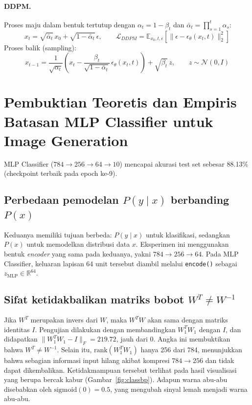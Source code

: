 \documentclass{article}
\begin{document}
\paragraph{DDPM.} Proses maju dalam bentuk tertutup dengan $\alpha_t = 1 - \beta_t$ dan $\bar{\alpha}_t = \prod_{s=1}^{t}\alpha_s$:
\begin{equation}
    x_t = \sqrt{\bar{\alpha}_t}\, x_0 + \sqrt{1 - \bar{\alpha}_t}\, \epsilon, \qquad
    \mathcal{L}_{DDPM} = \mathbb{E}_{x_0, t, \epsilon}\left[\lVert \epsilon - \epsilon_\theta(x_t, t) \rVert_2^2\right]
\end{equation}
Proses balik (sampling):
\begin{equation}
    x_{t-1} = \frac{1}{\sqrt{\alpha_t}}\left(x_t - \frac{\beta_t}{\sqrt{1 - \bar{\alpha}_t}}\,\epsilon_\theta(x_t, t)\right) + \sqrt{\beta_t}\, z, \qquad z \sim \mathcal{N}(0, I)
\end{equation}


\section{Pembuktian Teoretis dan Empiris Batasan MLP Classifier untuk Image Generation}

MLP Classifier ($784 \to 256 \to 64 \to 10$) mencapai akurasi test set sebesar 88.13\% (checkpoint terbaik pada epoch ke-9).

\subsection{Perbedaan pemodelan $P(y\mid x)$ berbanding $P(x)$}

Keduanya memiliki tujuan berbeda: $P(y\mid x)$ untuk klasifikasi, sedangkan $P(x)$ untuk memodelkan distribusi data $x$. Eksperimen ini menggunakan bentuk \textit{encoder} yang sama pada keduanya, yakni $784 \to 256 \to 64$. Pada MLP Classifier, keluaran lapisan 64 unit tersebut diambil melalui \texttt{encode()} sebagai $z_{\text{MLP}} \in \mathbb{R}^{64}$.

\subsection{Sifat ketidakbalikan matriks bobot $W^T \neq W^{-1}$}

Jika $W^T$ merupakan invers dari $W$, maka $W^T W$ akan sama dengan matriks identitas $I$. Pengujian dilakukan dengan membandingkan $W_1^T W_1$ dengan $I$, dan didapatkan $\lVert W_1^T W_1 - I \rVert_F = 219.72$, jauh dari 0. Angka ini membuktikan bahwa $W^T \neq W^{-1}$. Selain itu, $\mathrm{rank}(W_1^T W_1)$ hanya 256 dari 784, menunjukkan bahwa sebagian informasi input hilang akibat kompresi $784 \to 256$ dan tidak dapat dikembalikan. Ketidakmampuan tersebut terlihat pada hasil visualisasi yang berupa bercak kabur (Gambar~\ref{fig:classbp}). Adapun warna abu-abu disebabkan oleh $\mathrm{sigmoid}(0) = 0.5$, yang mengubah sinyal lemah menjadi warna abu-abu.
\end{document}

